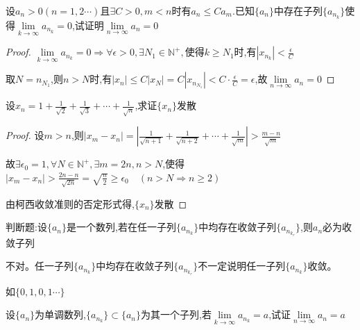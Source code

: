 \begin{exercise}
    设$a_n>0(n=1,2\cdots)$且$\exists C>0,m<n$时有$a_n\le Ca_m$.已知$\{a_n\}$中存在子列$\{a_{n_k}\}$使得$\lim \limits_{k \to \infty} a_{n_k}=0$,试证明$\lim \limits_{n \to \infty} a_n = 0$
\end{exercise}

\begin{proof}
    
    $\lim \limits_{k \to \infty} a_{n_k}=0 \Longrightarrow \forall \epsilon>0,\exists N_1 \in \mathbb{N}^+,\mbox{使得}k\ge N_1\mbox{时,有}|x_{n_k}|<\frac{\epsilon}{C}$

    取$N=n_{N_1}$,$\mbox{则}n>N\mbox{时,有}|x_n|\le C|x_{N}|=C|x_{n_{N_1}}|<C\cdot \frac{\epsilon}{C} =\epsilon$,故$\lim \limits_{n \to \infty} a_n = 0$
\end{proof}

\begin{exercise}
    设$x_n=1+\frac{1}{\sqrt{2}}+\frac{1}{\sqrt{3}}+\cdots+\frac{1}{\sqrt{n}}$,求证$\{x_n\}$发散
\end{exercise}

\begin{proof}
    设$m>n$,则$|x_m-x_n|=|\frac{1}{\sqrt{n+1}}+\frac{1}{\sqrt{n+2}}+\cdots+\frac{1}{\sqrt{m}}|>\frac{m-n}{\sqrt{m}}$

    故$\exists \epsilon_0 =1,\forall N\in \mathbb{N}^+,\exists m=2n,n >N$,使得$|x_{m}-x_{n}|>\frac{2n-n}{\sqrt{2n}} = \sqrt{\frac{n}{2}}\ge \epsilon_0 \quad (n>N\Longrightarrow n\ge 2)$

    由柯西收敛准则的否定形式得,$\{x_n\}$发散
\end{proof}

\begin{exercise}
    判断题:设$\{a_n\}$是一个数列,若在任一子列$\{a_{n_k}\}$中均存在收敛子列$\{a_{n_{k_r}}\}$,则$a_n$必为收敛子列
\end{exercise}

\begin{solution}
    不对。任一子列$\{a_{n_k}\}$中均存在收敛子列$\{a_{n_{k_r}}\}$不一定说明任一子列$\{a_{n_k}\}$收敛。

    如$\{0,1,0,1\cdots\}$
\end{solution}


\begin{exercise}
    设$\{a_n\}$为单调数列,$\{a_{n_k}\} \subset \{a_n\}$为其一个子列,若$\lim \limits_{k \to \infty} a_{n_k}=a$,试证$\lim \limits_{n \to \infty} a_n=a$
\end{exercise}

